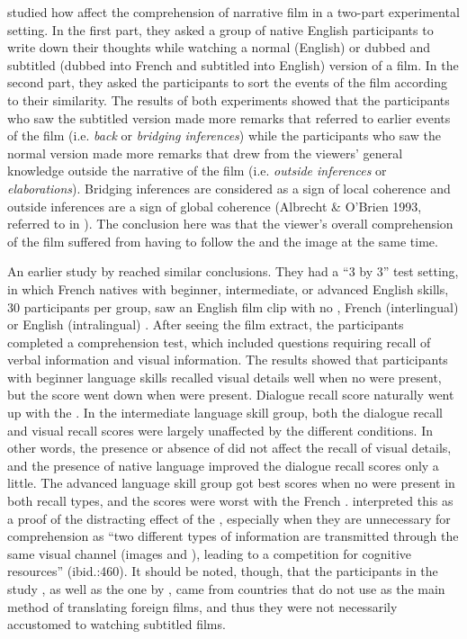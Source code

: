 \documentclass[output=paper]{langsci/langscibook}
\begin{document}
\citet{lee2013} studied how  affect the comprehension of narrative film in a two-part experimental setting. In the first part, they asked a group of native English participants to write down their thoughts while watching a normal (English) or dubbed and subtitled (dubbed into French and subtitled into English) version of a film. In the second part, they asked the participants to sort the events of the film according to their similarity. The results of both experiments showed that the participants who saw the subtitled version made more remarks that referred to earlier events of the film (i.e. \textit{back} or \textit{bridging inferences}) while the participants who saw the normal version made more remarks that drew from the viewers’ general knowledge outside the narrative of the film (i.e. \textit{outside inferences} or \textit{elaborations}). Bridging inferences are considered as a sign of local coherence and outside inferences are a sign of global coherence (Albrecht \& O'Brien 1993, referred to in \citealt{lee2013}). The conclusion here was that the viewer's overall comprehension of the film suffered from having to follow the  and the image at the same time.

\largerpage
An earlier study by \citet{lavaur2011} reached similar conclusions. They had a ``3 by 3'' test setting, in which French natives with beginner, intermediate, or advanced English skills, 30 participants per group, saw an English film clip with no , French (interlingual)  or English (intralingual) . After seeing the film extract, the participants completed a comprehension test, which included questions requiring recall of verbal information and visual information. The results showed that participants with beginner language skills recalled visual details well when no  were present, but the score went down when  were present. Dialogue recall score naturally went up with the . In the intermediate language skill group, both the dialogue recall and visual recall scores were largely unaffected by the different  conditions. In other words, the presence or absence of  did not affect the recall of visual details, and the presence of native language  improved the dialogue recall scores only a little. The advanced language skill group got best scores when no  were present in both recall types, and the scores were worst with the French . \citet{lavaur2011} interpreted this as a proof of the distracting effect of the , especially when they are unnecessary for comprehension as ``two different types of information are transmitted through the same visual channel (images and ), leading to a competition for cognitive resources'' (ibid.:460). It should be noted, though, that the participants in the study \citet{lavaur2011}, as well as the one by \citet{lee2013}, came from countries that do not use  as the main method of translating foreign films, and thus they were not necessarily accustomed to watching subtitled films. 
 
\end{document}
